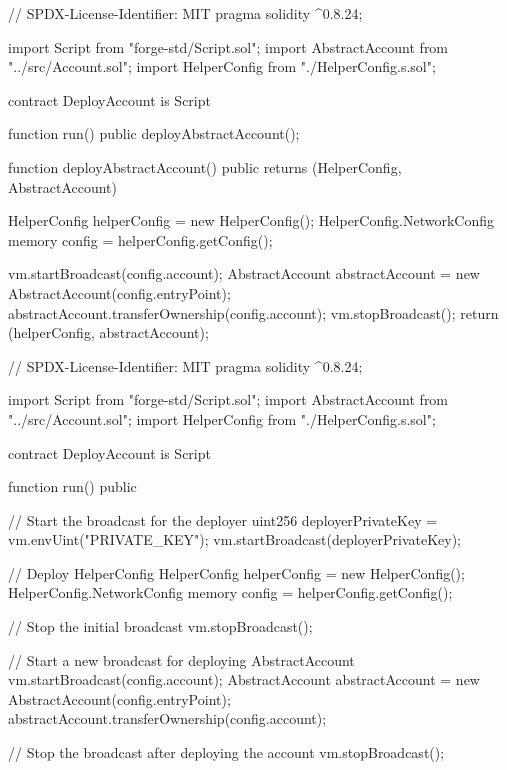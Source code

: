 // SPDX-License-Identifier: MIT
pragma solidity ^0.8.24;

import {Script} from "forge-std/Script.sol";
import {AbstractAccount} from "../src/Account.sol"; 
import {HelperConfig} from "./HelperConfig.s.sol";

contract DeployAccount is Script {
      function run() public {
        deployAbstractAccount();
    }

    function deployAbstractAccount() public returns (HelperConfig, AbstractAccount) {
        HelperConfig helperConfig = new HelperConfig();
        HelperConfig.NetworkConfig memory config = helperConfig.getConfig();

        vm.startBroadcast(config.account);
        AbstractAccount abstractAccount = new AbstractAccount(config.entryPoint);
        abstractAccount.transferOwnership(config.account);
        vm.stopBroadcast();
        return (helperConfig, abstractAccount);
    }
}


// SPDX-License-Identifier: MIT
pragma solidity ^0.8.24;

import {Script} from "forge-std/Script.sol";
import {AbstractAccount} from "../src/Account.sol"; 
import {HelperConfig} from "./HelperConfig.s.sol";

contract DeployAccount is Script {
    function run() public {
        // Start the broadcast for the deployer
        uint256 deployerPrivateKey = vm.envUint("PRIVATE_KEY");
        vm.startBroadcast(deployerPrivateKey);
        
        // Deploy HelperConfig
        HelperConfig helperConfig = new HelperConfig();
        HelperConfig.NetworkConfig memory config = helperConfig.getConfig();
        
        // Stop the initial broadcast
        vm.stopBroadcast();
        
        // Start a new broadcast for deploying AbstractAccount
        vm.startBroadcast(config.account);
        AbstractAccount abstractAccount = new AbstractAccount(config.entryPoint);
        abstractAccount.transferOwnership(config.account);
        
        // Stop the broadcast after deploying the account
        vm.stopBroadcast();
    }
}
